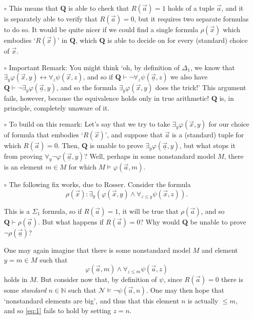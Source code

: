 \documentclass{article}
\newcommand{\N}{\mathbb{N}}
\newcommand{\RQ}{\mathbf{Q}}
\newcommand{\TN}{\mathcal{N}}
\newcommand\point[1]{\noindent \hspace{\labelsep} {\small $\circ$ #1} \smallskip}
\begin{document}
\point{This means that $\RQ$ is able to check that $R(\vec a) = 1$ holds of a tuple $\vec a$, and it is separately able to verify that $R(\vec a) = 0$, but it requires two separate formulas to do so. It would be quite nicer if we could find a single formula $\rho(\vec x)$ which embodies `$R(\vec x)$' in $\RQ$, which $\RQ$ is able to decide on for every (standard) choice of $\vec x$.}

\point{Important Remark: You might think `oh, by definition of $\Delta_1$, we know that $\exists_y \varphi(\vec x, y) \leftrightarrow \forall_z \psi(\vec x, z)$, and so if $\RQ \vdash \neg\forall_z \psi(\underline{\vec a}, z)$ we also have $\RQ \vdash \neg \exists_y \varphi(\underline{\vec a}, y)$, and so the formula $\exists_y \varphi(\vec x, y)$ does the trick!' This argument fails, however, because the equivalence holds only in true arithmetic! $\RQ$ is, in principle, completely unaware of it.}

\point{To build on this remark: Let's say that we try to take $\exists_y \varphi(\vec x, y)$ for our choice of formula that embodies `$R(\vec x)$', and suppose that $\vec a$ is a (standard) tuple for which $R(\vec a) = 0$. Then, $\RQ$ is unable to prove $\exists_y \varphi(\underline{\vec a}, y)$, but what stops it from proving $\forall_y \neg\varphi(\underline{\vec a}, y)$? Well, perhaps in some nonstandard model $M$, there is an element $m \in M$ for which $M \vDash \varphi(\vec a, m)$.}

\point{The following fix works, due to Rosser. Consider the formula
\begin{equation}
\rho(\vec x) \colon \exists_y (\varphi(\vec x, y) \land \forall_{z \leq y} \psi(\vec x, z)).
\end{equation}

This is a $\Sigma_1$ formula, so if $R(\vec a) = 1$, it will be true that $\rho(\vec a)$, and so $\RQ \vdash \rho(\underline{\vec a})$. But what happens if $R(\vec a) = 0$? Why would $\RQ$ be unable to prove $\neg\rho(\underline{\vec a})$?

One may again imagine that there is some nonstandard model $M$ and element $y = m \in M$ such that
\begin{equation}\label{eq:1}
\varphi(\vec a, m) \land \forall_{z \leq m} \psi(\vec a, z)
\end{equation}
holds in $M$. But consider now that, by definition of $\psi$, since $R(\vec a) = 0$ there is some \emph{standard} $n \in \N$ such that $\TN \vDash \neg\psi(\vec a, n)$. One may then hope that `nonstandard elements are big', and thus that this element $n$ is actually $\leq m$, and so \eqref{eq:1} fails to hold by setting $z = n$.
}
\end{document}
